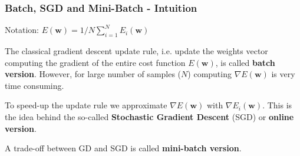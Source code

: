 \documentclass{beamer}
\begin{document}
	\begin{frame}
		\frametitle{Batch, SGD and Mini-Batch - Intuition}
		Notation: $E(\bm{w}) = 1/N \sum_{i=1}^N E_i(\bm{w})$
		
		\vspace{5mm}
		
		
		The classical gradient descent update rule, i.e. update the weights vector computing the gradient of the entire cost function $E(\bm{w})$, is called \textbf{batch version}. However, for large number of samples ($N$) computing $\nabla E(\bm{w})$ is very time consuming.
		
		\vspace{5mm}
		
		To speed-up the update rule we approximate $\nabla E(\bm{w})$ with $\nabla E_i(\bm{w})$. This is the idea behind the so-called \textbf{Stochastic Gradient Descent} (SGD) or \textbf{online version}.
		
		\vspace{5mm}
		
		A trade-off between GD and SGD is called \textbf{mini-batch version}.
	\end{frame}
\end{document}
